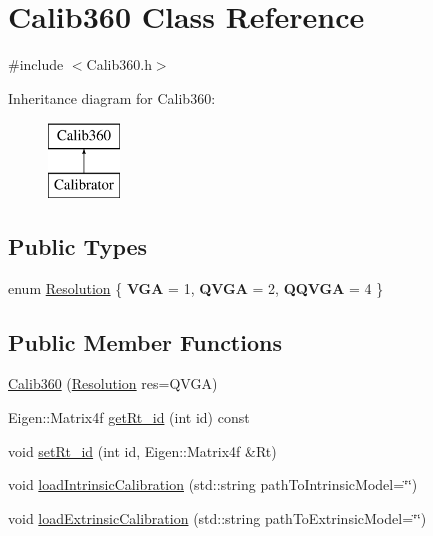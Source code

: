 \hypertarget{classCalib360}{\section{Calib360 Class Reference}
\label{classCalib360}
}


{\ttfamily \#include $<$Calib360.\-h$>$}

Inheritance diagram for Calib360\-:\begin{figure}[H]
\begin{center}
\leavevmode
\includegraphics[height=2.000000cm]{classCalib360}
\end{center}
\end{figure}
\subsection*{Public Types}
\begin{DoxyCompactItemize}
\item 
enum \hyperlink{classCalib360_a323701c4815353e02f79ce58a9ef2e12}{Resolution} \{ {\bfseries V\-G\-A} = 1, 
{\bfseries Q\-V\-G\-A} = 2, 
{\bfseries Q\-Q\-V\-G\-A} = 4
 \}
\end{DoxyCompactItemize}
\subsection*{Public Member Functions}
\begin{DoxyCompactItemize}
\item 
\hyperlink{classCalib360_ab2365a4a8b4453258ff2664aa9d80a11}{Calib360} (\hyperlink{classCalib360_a323701c4815353e02f79ce58a9ef2e12}{Resolution} res=Q\-V\-G\-A)
\item 
Eigen\-::\-Matrix4f \hyperlink{classCalib360_a700a92c794bceaacbb200eacd281fda1}{get\-Rt\-\_\-id} (int id) const 
\item 
void \hyperlink{classCalib360_a8f9c38de4304edacc433a1e3b6e54e41}{set\-Rt\-\_\-id} (int id, Eigen\-::\-Matrix4f \&Rt)
\item 
void \hyperlink{classCalib360_a01c3fc478c6614f2a78db01575223940}{load\-Intrinsic\-Calibration} (std\-::string path\-To\-Intrinsic\-Model=\char`\"{}\char`\"{})
\item 
void \hyperlink{classCalib360_ad9833ea56bb48ff7a488ce8d77566ca6}{load\-Extrinsic\-Calibration} (std\-::string path\-To\-Extrinsic\-Model=\char`\"{}\char`\"{})
\end{DoxyCompactItemize}
